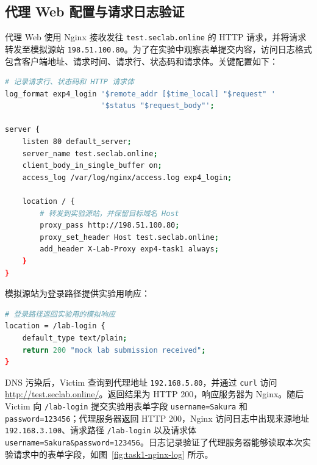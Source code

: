 
\subsection{代理 Web 配置与请求日志验证}

代理 Web 使用 Nginx 接收发往 \texttt{test.seclab.online} 的 HTTP 请求，并将请求转发至模拟源站 \texttt{198.51.100.80}。为了在实验中观察表单提交内容，访问日志格式包含客户端地址、请求时间、请求行、状态码和请求体。关键配置如下：

\begin{samepage}
\begin{lstlisting}[language=bash,caption={代理 Web 的 Nginx 反向代理与请求体日志配置}]
# 记录请求行、状态码和 HTTP 请求体
log_format exp4_login '$remote_addr [$time_local] "$request" '
                      '$status "$request_body"';

server {
    listen 80 default_server;
    server_name test.seclab.online;
    client_body_in_single_buffer on;
    access_log /var/log/nginx/access.log exp4_login;

    location / {
        # 转发到实验源站，并保留目标域名 Host
        proxy_pass http://198.51.100.80;
        proxy_set_header Host test.seclab.online;
        add_header X-Lab-Proxy exp4-task1 always;
    }
}
\end{lstlisting}
\end{samepage}

模拟源站为登录路径提供实验用响应：

\begin{samepage}
\begin{lstlisting}[language=bash,caption={模拟源站对实验登录路径的响应}]
# 登录路径返回实验用的模拟响应
location = /lab-login {
    default_type text/plain;
    return 200 "mock lab submission received";
}
\end{lstlisting}
\end{samepage}

DNS 污染后，Victim 查询到代理地址 \texttt{192.168.5.80}，并通过 \texttt{curl} 访问 \url{http://test.seclab.online/}。返回结果为 HTTP 200，响应服务器为 Nginx。随后 Victim 向 \texttt{/lab-login} 提交实验用表单字段 \texttt{username=Sakura} 和 \texttt{password=123456}；代理服务器返回 HTTP 200，Nginx 访问日志中出现来源地址 \texttt{192.168.3.100}、请求路径 \texttt{/lab-login} 以及请求体 \texttt{username=Sakura\&password=123456}。日志记录验证了代理服务器能够读取本次实验请求中的表单字段，如图~\ref{fig:task1-nginx-log} 所示。

